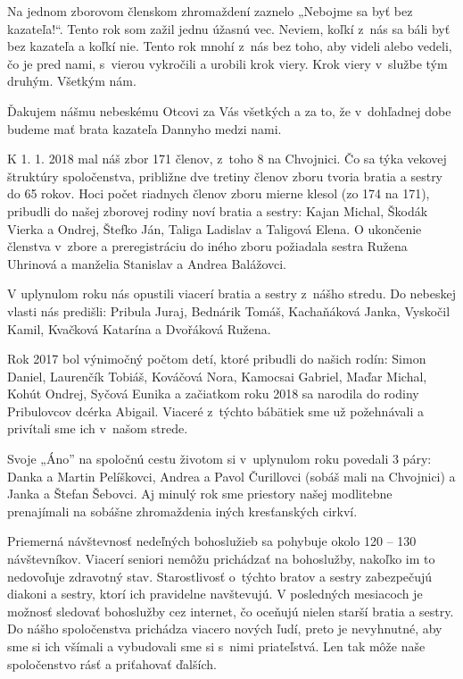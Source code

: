 Na jednom zborovom členskom zhromaždení zaznelo „Nebojme sa byť bez kazateľa!“.  Tento rok som zažil jednu úžasnú vec. Neviem, koľkí z~nás sa báli byť bez kazateľa a koľkí nie. Tento rok mnohí z~nás bez toho, aby videli alebo vedeli, čo je pred nami, s~vierou vykročili a urobili krok viery. Krok viery v~službe tým druhým. Všetkým nám.

Ďakujem nášmu nebeskému Otcovi za Vás všetkých a za to, že v~dohľadnej dobe budeme mať brata kazateľa Dannyho medzi nami.


K 1. 1. 2018 mal náš zbor 171 členov, z~toho 8 na Chvojnici. Čo sa týka vekovej štruktúry spoločenstva, približne dve tretiny členov zboru tvoria bratia a sestry do 65 rokov. Hoci počet riadnych členov zboru mierne klesol (zo 174 na 171), pribudli do našej zborovej rodiny noví bratia a sestry:  Kajan Michal, Škodák Vierka a Ondrej, Štefko Ján, Taliga Ladislav a Taligová Elena. O ukončenie členstva v~zbore a preregistráciu do iného zboru požiadala sestra Ružena Uhrinová a manželia Stanislav a Andrea Balážovci.

V uplynulom roku nás opustili viacerí bratia a sestry z~nášho stredu. Do nebeskej vlasti nás predišli: Pribula Juraj, Bednárik Tomáš, Kachaňáková Janka, Vyskočil Kamil, Kvačková Katarína a Dvořáková Ružena.

Rok 2017 bol výnimočný počtom detí, ktoré pribudli do našich rodín: Simon Daniel, Laurenčík Tobiáš, Kováčová Nora, Kamocsai Gabriel, Maďar Michal, Kohút Ondrej, Syčová Eunika a začiatkom roku 2018 sa narodila do rodiny Pribulovcov dcérka Abigail. Viaceré z~týchto bábätiek sme už požehnávali a privítali sme ich v~našom strede.

Svoje „Áno” na spoločnú cestu životom si v~uplynulom roku povedali 3 páry: Danka a Martin Pelíškovci, Andrea a Pavol Čurillovci (sobáš mali na Chvojnici) a Janka a Štefan Šebovci. Aj minulý rok sme priestory našej modlitebne prenajímali na sobášne zhromaždenia iných kresťanských cirkví.

Priemerná návštevnosť nedeľných bohoslužieb sa pohybuje okolo 120 – 130 návštevníkov. Viacerí seniori nemôžu prichádzať na bohoslužby, nakoľko im to nedovoľuje zdravotný stav. Starostlivosť o~týchto bratov a sestry zabezpečujú diakoni a sestry, ktorí ich pravidelne navštevujú. V posledných mesiacoch je možnosť sledovať bohoslužby cez internet, čo oceňujú nielen starší bratia a sestry. Do nášho spoločenstva prichádza viacero nových ľudí, preto je nevyhnutné, aby sme si ich všímali a vybudovali sme si s~nimi priateľstvá. Len tak môže naše spoločenstvo rásť a priťahovať ďalších.

